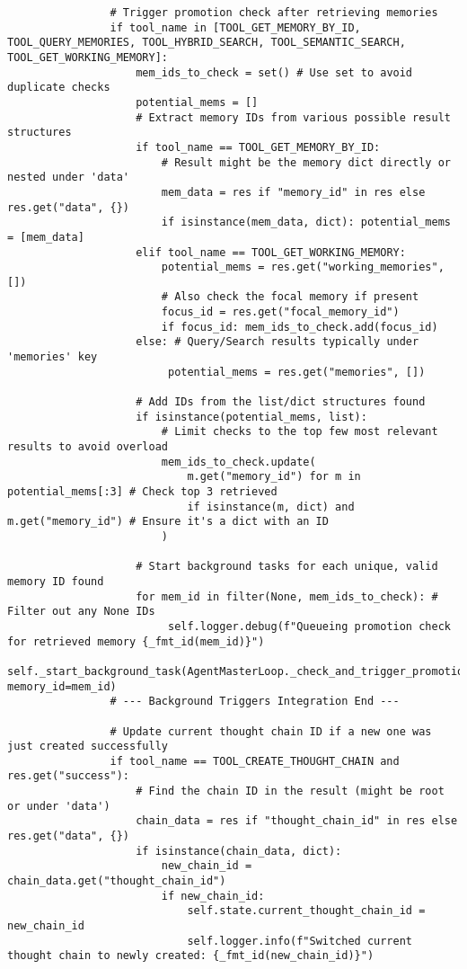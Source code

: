 \documentclass[12pt,a4paper]{article}
\begin{document}
\begin{pageablecode}
\begin{verbatim}
                # Trigger promotion check after retrieving memories
                if tool_name in [TOOL_GET_MEMORY_BY_ID, TOOL_QUERY_MEMORIES, TOOL_HYBRID_SEARCH, TOOL_SEMANTIC_SEARCH, TOOL_GET_WORKING_MEMORY]:
                    mem_ids_to_check = set() # Use set to avoid duplicate checks
                    potential_mems = []
                    # Extract memory IDs from various possible result structures
                    if tool_name == TOOL_GET_MEMORY_BY_ID:
                        # Result might be the memory dict directly or nested under 'data'
                        mem_data = res if "memory_id" in res else res.get("data", {})
                        if isinstance(mem_data, dict): potential_mems = [mem_data]
                    elif tool_name == TOOL_GET_WORKING_MEMORY:
                        potential_mems = res.get("working_memories", [])
                        # Also check the focal memory if present
                        focus_id = res.get("focal_memory_id")
                        if focus_id: mem_ids_to_check.add(focus_id)
                    else: # Query/Search results typically under 'memories' key
                         potential_mems = res.get("memories", [])

                    # Add IDs from the list/dict structures found
                    if isinstance(potential_mems, list):
                        # Limit checks to the top few most relevant results to avoid overload
                        mem_ids_to_check.update(
                            m.get("memory_id") for m in potential_mems[:3] # Check top 3 retrieved
                            if isinstance(m, dict) and m.get("memory_id") # Ensure it's a dict with an ID
                        )

                    # Start background tasks for each unique, valid memory ID found
                    for mem_id in filter(None, mem_ids_to_check): # Filter out any None IDs
                         self.logger.debug(f"Queueing promotion check for retrieved memory {_fmt_id(mem_id)}")
                         self._start_background_task(AgentMasterLoop._check_and_trigger_promotion, memory_id=mem_id)
                # --- Background Triggers Integration End ---

                # Update current thought chain ID if a new one was just created successfully
                if tool_name == TOOL_CREATE_THOUGHT_CHAIN and res.get("success"):
                    # Find the chain ID in the result (might be root or under 'data')
                    chain_data = res if "thought_chain_id" in res else res.get("data", {})
                    if isinstance(chain_data, dict):
                        new_chain_id = chain_data.get("thought_chain_id")
                        if new_chain_id:
                            self.state.current_thought_chain_id = new_chain_id
                            self.logger.info(f"Switched current thought chain to newly created: {_fmt_id(new_chain_id)}")


\end{verbatim}
\end{pageablecode}
\end{document}
